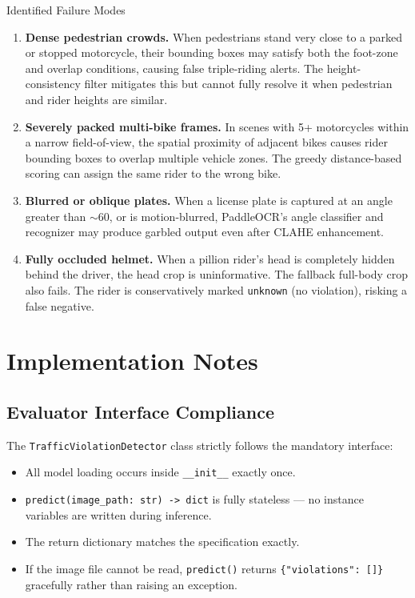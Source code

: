 \documentclass[12pt,a4paper]{article}
\begin{document}
\begin{infobox}{Identified Failure Modes}
\begin{enumerate}[label=\textbf{F\arabic*.}]
  \item \textbf{Dense pedestrian crowds.} When pedestrians stand very close to a parked
        or stopped motorcycle, their bounding boxes may satisfy both the foot-zone and
        overlap conditions, causing false triple-riding alerts. The height-consistency
        filter mitigates this but cannot fully resolve it when pedestrian and rider
        heights are similar.

  \item \textbf{Severely packed multi-bike frames.} In scenes with 5+ motorcycles within
        a narrow field-of-view, the spatial proximity of adjacent bikes causes rider
        bounding boxes to overlap multiple vehicle zones. The greedy distance-based
        scoring can assign the same rider to the wrong bike.

  \item \textbf{Blurred or oblique plates.} When a license plate is captured at an angle
        greater than $\sim$60\textdegree, or is motion-blurred, PaddleOCR's angle
        classifier and recognizer may produce garbled output even after CLAHE enhancement.

  \item \textbf{Fully occluded helmet.} When a pillion rider's head is completely hidden
        behind the driver, the head crop is uninformative. The fallback full-body crop
        also fails. The rider is conservatively marked \texttt{unknown} (no violation),
        risking a false negative.
\end{enumerate}
\end{infobox}

\section{Implementation Notes}

\subsection{Evaluator Interface Compliance}
The \texttt{TrafficViolationDetector} class strictly follows the mandatory interface:
\begin{itemize}
  \item All model loading occurs inside \texttt{\_\_init\_\_} exactly once.
  \item \texttt{predict(image\_path: str) -> dict} is fully stateless — no instance
        variables are written during inference.
  \item The return dictionary matches the specification exactly.
  \item If the image file cannot be read, \texttt{predict()} returns
        \texttt{\{"violations": []\}} gracefully rather than raising an exception.
\end{itemize}
\end{document}

